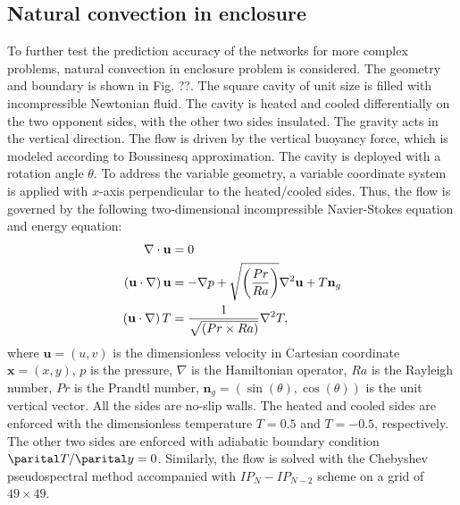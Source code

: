 \documentclass[preprint, 10pt]{elsarticle}
\begin{document}
\subsection{Natural convection in enclosure}
To further test the prediction accuracy of the networks for more complex problems, natural convection in enclosure problem is considered. The geometry and boundary is shown in Fig. ??. The square cavity of unit size is filled with incompressible Newtonian fluid. The cavity is heated and cooled differentially on the two opponent sides, with the other two sides insulated. The gravity acts in the vertical direction. The flow is driven by the vertical buoyancy force, which is modeled according to Boussinesq approximation. The cavity is deployed with a rotation angle $\theta$. To address the variable geometry, a variable coordinate system is applied with $x$-axis perpendicular to the heated/cooled sides.
Thus, the flow is governed by the following two-dimensional incompressible Navier-Stokes equation and energy equation:
\begin{equation}
\begin{aligned}
\nabla  \cdot {\bf{u}} &= 0 \\
\left( {{\bf{u}} \cdot \nabla } \right){\bf{u}} &=  - \nabla p + \sqrt{\left(\frac{Pr}{Ra}\right)}{\nabla ^2}{\bf{u}} + T\mathbf{n}_g \\
\left( {{\bf{u}} \cdot \nabla } \right)T        &=  \frac{1}{\sqrt{\left({Pr}\times{Ra}\right)}}{\nabla ^2}T,
\end{aligned}
\label{eq_GoverningEqsNaturalConvection}
\end{equation}
where $\mathbf{u}=(u,v)$ is the dimensionless velocity in Cartesian coordinate $\mathbf{x}=(x,y)$, $p$ is the pressure, $\nabla$ is the  Hamiltonian operator, $Ra$ is the Rayleigh number, $Pr$ is the Prandtl number, $\mathbf{n}_g=\left(\sin(\theta),\cos(\theta) \right)$ is the unit vertical vector. All the sides are no-slip walls. The heated and cooled sides are enforced with the dimensionless temperature $T=0.5$ and $T=-0.5$, respectively. The other two sides are enforced with adiabatic boundary condition $\parital T / \parital y=0$.
Similarly, the flow is solved with the Chebyshev pseudospectral method accompanied with $IP_{N}-IP_{N-2}$ scheme on a grid of $49 \times 49$.
\end{document}
